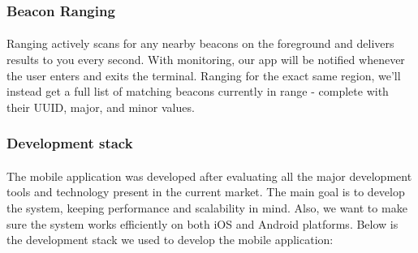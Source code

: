 \documentclass[12pt]{article}
\begin{document}
\subsubsection{Beacon Ranging}
\paragraph{} Ranging actively scans for any nearby beacons on the foreground and delivers results to you every second. With monitoring, our app will be notified whenever the user enters and exits the terminal. Ranging for the exact same region, we’ll instead get a full list of matching beacons currently in range - complete with their UUID, major, and minor values.

\subsubsection{Development stack}
\paragraph{} The mobile application was developed after evaluating all the major development tools and technology present in the current market. The main goal is to develop the system, keeping performance and scalability in mind. Also, we want to make sure the system works efficiently on both iOS and Android platforms. Below is the development stack we used to develop the mobile application:
\end{document}
